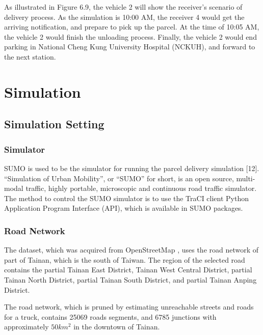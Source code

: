 \documentclass[12pt]{ksthesis}
\begin{document}
\begin{thesis}
{As illustrated in Figure 6.9, the vehicle 2 will show the receiver’s scenario of delivery process. As the simulation is 10:00 AM, the receiver 4 would get the arriving notification, and prepare to pick up the parcel. At the time of 10:05 AM, the vehicle 2 would finish the unloading process. Finally, the vehicle 2 would end parking in National Cheng Kung University Hospital (NCKUH), and forward to the next station.








\chapter{Simulation}\label{Chap:Simulation}

\section{Simulation Setting}

\subsection{Simulator}
SUMO is used to be the simulator for running the parcel delivery simulation [12]. “Simulation of Urban Mobility”, or “SUMO” for short, is an open source, multi-modal traffic, highly portable, microscopic and continuous road traffic simulator. The method to control the SUMO simulator is to use the TraCI client Python Application Program Interface (API), which is available in SUMO packages.

\subsection{Road Network}

The dataset, which was acquired from OpenStreetMap \cite{Haklay2008} , uses the road network of part of Tainan, which is the south of Taiwan. The region of the selected road contains the partial Tainan East District, Tainan West Central District, partial Tainan North District, partial Tainan South District, and partial Tainan Anping District.

The road network, which is pruned by estimating unreachable streets and roads for a truck, contains 25069 roads segments, and 6785 junctions with approximately $50km^{2}$ in the downtown of Tainan.

}
\end{thesis}
\end{document}
